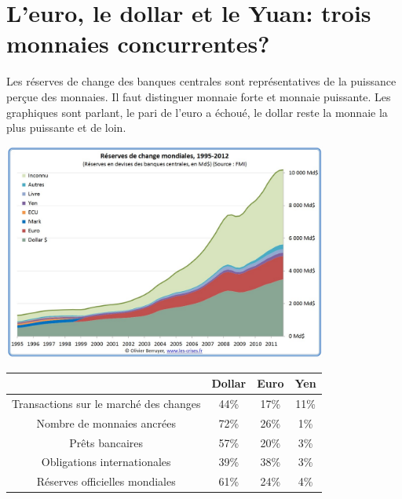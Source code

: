\documentclass[main.tex]{subfiles}
\begin{document}
        \section{L'euro, le dollar et le Yuan: trois monnaies concurrentes?}
        \begin{minipage}{0.5\textwidth}
                Les réserves de change des banques centrales sont représentatives de la puissance perçue des monnaies. Il faut distinguer monnaie forte et monnaie puissante. Les graphiques sont parlant, le pari de l'euro a échoué, le dollar reste la monnaie la plus puissante et de loin.
        \end{minipage}
        \hfill
        \begin{minipage}{0.5\textwidth}
                \centering
                \includegraphics[width=0.8\textwidth]{res_mon.jpg}
        \end{minipage}
        \medskip

        \center
        \begin{tabular}{|*{4}{c|}}
               \hline
               & Dollar & Euro & Yen \\
               \hline
               Transactions sur le marché des changes & 44\% & 17\% & 11\% \\
               \hline
               Nombre de monnaies ancrées & 72\% & 26\% & 1\% \\
               \hline
               Prêts bancaires & 57\% & 20\% & 3\% \\
               \hline
               Obligations internationales & 39\% & 38\% & 3\% \\
               \hline
               Réserves officielles mondiales & 61\% & 24\% & 4\% \\
               \hline
        \end{tabular}
        \label{tab:title}
\end{document}
